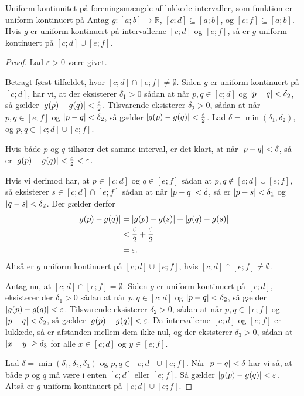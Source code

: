 \begin{theorem}[label=theo:uniform_fælles]{Uniform kontinuitet på foreningsmængde af lukkede intervaller, som funktion er uniform kontinuert på}{}
  Antag $g:[a;b]\to \mathbb{R}$, $[c;d] \subseteq [a;b]$, og $[e;f]\subseteq [a;b]$.
  Hvis $g$ er uniform kontinuert på intervallerne $[c;d]$ og $[e;f]$, så er $g$ uniform kontinuert på $[c;d] \cup [e;f]$.
\end{theorem}
\begin{proof} 
  Lad $\varepsilon >0$ være givet. 

  Betragt først tilfældet, hvor $[c;d]\cap [e;f]\neq \emptyset $.
  Siden $g$ er uniform kontinuert på $[c;d]$, har vi, at der eksisterer $\delta _1>0$ sådan at når $p, q \in [c;d]$ og $\abs{p-q} <\delta _2$, så gælder $\abs{g(p)-g(q)} < \frac{\varepsilon }{2} $. 
  Tilsvarende eksisterer $\delta _2>0$, sådan at når $p, q \in [e;f]$ og $\abs{p-q} < \delta _2 $, så gælder $\abs{g(p)-g(q)} <\frac{\varepsilon }{2}$. 
  Lad $\delta =\min (\delta _1, \delta _2)$, og $p, q \in [c;d] \cup [e;f]$.

  \noindent Hvis både $p$ og $q$ tilhører det samme interval, er det klart, at når $\abs{p-q}<\delta  $, så er $\abs{g(p)-g(q)} <\frac{\varepsilon }{2} < \varepsilon  $. 

  \noindent Hvis vi derimod har, at $p \in [c;d]$ og $q \in [e;f]$ sådan at $p, q \not\in [c;d] \cup [e;f]$, så eksisterer $s \in [c;d] \cap [e;f]$ sådan at når $\abs{p-q} <\delta $, så er $\abs{p-s} <\delta _1$ og $\abs{q-s} <\delta _2$.
  Der gælder derfor
  \begin{equation*}
  \begin{split}
    \abs{g(p)-g(q)} &= \abs{g(p)-g(s)} + \abs{g(q)-g(s)} \\
  &< \frac{\varepsilon }{2} + \frac{\varepsilon }{2} \\
  &=\varepsilon.
  \end{split}
  \end{equation*}
  Altså er $g$ uniform kontinuert på $[c;d] \cup [e;f]$, hvis $[c;d] \cap [e;f]\neq \emptyset $.

  Antag nu, at $[c;d] \cap [e;f] = \emptyset $.
Siden $g$ er uniform kontinuert på $[c;d]$, eksisterer der $\delta _1>0$ sådan at når $p, q \in [c;d]$ og $\abs{p-q} <\delta _2$, så gælder $\abs{g(p)-g(q)} < \varepsilon$.
Tilsvarende eksisterer $\delta _2>0$, sådan at når $p, q \in [e;f]$ og $\abs{p-q} < \delta _2 $, så gælder $\abs{g(p)-g(q)} <\varepsilon$. 
  Da intervallerne $[c;d]$ og $[e;f]$ er lukkede, så er afstanden mellem dem ikke nul, og der eksisterer $\delta _3>0$, sådan at $\abs{x-y}\geq \delta _3$ for alle $x \in [c;d]$ og $y \in [e;f]$.

  \noindent Lad $\delta = \min (\delta _1, \delta _2, \delta _3)$ og $p, q \in [c;d] \cup [e;f]$.
  Når $\abs{p-q} <\delta $ har vi så, at både $p$ og $q$ må være i enten $[c;d]$ eller $[e;f]$.
  Så gælder $\abs{g(p)-g(q)} <\varepsilon $.
  Altså er $g$ uniform kontinuert på $[c;d] \cup [e;f]$. 
\end{proof}

